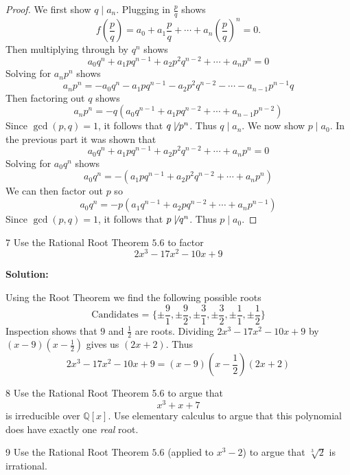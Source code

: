 \begin{proof}
    We first show $q \mid a_n$.
    Plugging in $\frac{p}{q}$ shows 
    \[f\left(\frac{p}{q}\right) = a_0 + a_1 \frac{p}{q} + \cdots + a_n \left(\frac{p}{q}\right)^n = 0.\]
    Then multiplying through by $q^n$ shows 
    \[a_0 q^n + a_1 p q^{n - 1} + a_2 p^2 q^{n-2} + \cdots + a_n p^n = 0\]
    Solving for $a_n p^n$ shows 
    \[a_n p^n = - a_0 q^n - a_1 p q^{n - 1} - a_2 p^2 q^{n-2} - \cdots - a_{n - 1} p^{n-1} q\]
    Then factoring out $q$ shows 
    \[a_n p^n = -q(a_0 q^{n-1} + a_1 p q^{n - 2} + \cdots + a_{n - 1} p^{n-2})\]
    Since $\gcd(p, q) = 1$, it follows that $q \not \mid p^n$.
    Thus $q \mid a_n$.
    We now show $p \mid a_0$.
    In the previous part it was shown that 
    \[a_0 q^n + a_1 p q^{n - 1} + a_2 p^2 q^{n-2} + \cdots + a_n p^n = 0\]
    Solving for $a_0 q^n$ shows 
    \[a_0 q^n = -(a_1 p q^{n - 1} + a_2 p^2 q^{n-2} + \cdots + a_n p^n)\]
    We can then factor out $p$ so 
    \[a_0 q^n = -p(a_1 q^{n - 1} + a_2 p q^{n-2} + \cdots + a_n p^{n - 1})\]
    Since $\gcd(p, q) = 1$, it follows that $p \not \mid q^n$.
    Thus $p \mid a_0$.
\end{proof}

\begin{problem}{7}
    Use the Rational Root Theorem $5.6$ to factor 
    \[2x^3 - 17x^2 - 10x + 9\]
\end{problem}
\solved

\textbf{Solution:}

Using the Root Theorem we find the following possible roots
\[\text{Candidates = } \{\pm \frac{9}{1},\pm \frac{9}{2},\pm \frac{3}{1},\pm \frac{3}{2},\pm \frac{1}{1},\pm \frac{1}{2}\}\]
Inspection shows that $9$ and $\frac{1}{2}$ are roots.
Dividing $2x^3 - 17x^2 - 10x + 9$ by $(x - 9)(x - \frac{1}{2})$ gives us $(2x + 2)$. Thus 
\[2x^3 - 17x^2 - 10x + 9 = (x - 9)(x - \frac{1}{2})(2x + 2)\]

\begin{problem}{8}
    Use the Rational Root Theorem 5.6 to argue that
    \[x^3 + x + 7\]
    is irreducible over $\mathbb{Q}[x]$. Use elementary calculus to argue that this
    polynomial does have exactly one \emph{real} root.
\end{problem}
\unsolved

\begin{problem}{9}
    Use the Rational Root Theorem $5.6$ (applied to $x^3 - 2$)
    to argue that $\sqrt[3]{2}$ is irrational.
\end{problem}
\solved

